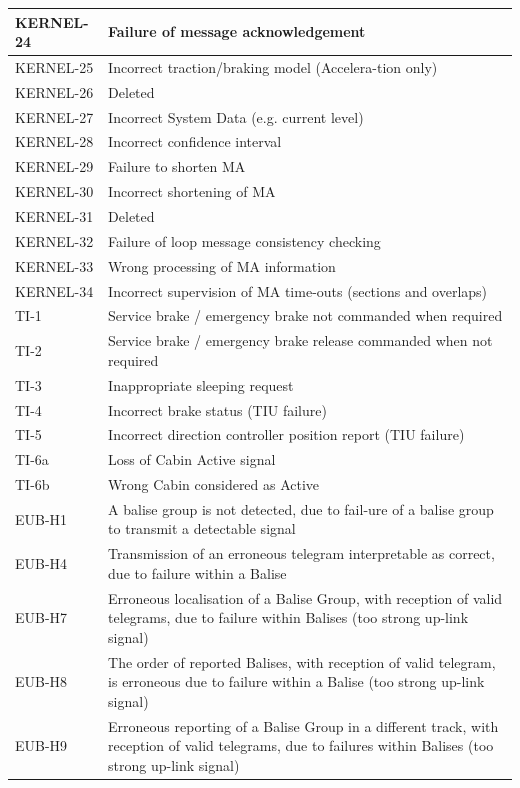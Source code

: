 \documentclass{template/openetcs_article}
\begin{document}
\begin{center}
\begin{longtable}{|m{3cm}|m{13cm}|}
KERNEL-24 & Failure of message acknowledgement \\\hline
KERNEL-25 & Incorrect traction/braking model (Accelera-tion only) \\\hline
KERNEL-26 & Deleted \\\hline
KERNEL-27 & Incorrect System Data (e.g. current level) \\\hline
KERNEL-28 & Incorrect confidence interval \\\hline
KERNEL-29 & Failure to shorten MA \\\hline
KERNEL-30 & Incorrect shortening of MA \\\hline
KERNEL-31 & Deleted \\\hline
KERNEL-32 & Failure of loop message consistency checking \\\hline
KERNEL-33 & Wrong processing of MA information \\\hline
KERNEL-34 & Incorrect supervision of MA time-outs (sections and overlaps) \\\hline
TI-1 & Service brake / emergency brake not commanded when required\\\hline
TI-2 & Service brake / emergency brake release commanded when not required\\\hline
TI-3 & Inappropriate sleeping request\\\hline
TI-4 & Incorrect brake status (TIU failure)\\\hline
TI-5 & Incorrect direction controller position report (TIU failure)\\\hline
TI-6a & Loss of Cabin Active signal\\\hline
TI-6b & Wrong Cabin considered as Active\\\hline
EUB-H1 & A balise group is not detected, due to fail-ure of a balise group to transmit a detectable signal\\\hline
EUB-H4 & Transmission of an erroneous telegram interpretable as correct, due to failure within a Balise\\\hline
EUB-H7 & Erroneous localisation of a Balise Group, with reception of valid telegrams, due to failure within Balises (too strong up-link signal)\\\hline
EUB-H8 & The order of reported Balises, with reception of valid telegram, is erroneous due to failure within a Balise (too strong up-link signal)\\\hline
EUB-H9 & Erroneous reporting of a Balise Group in a different track, with reception of valid telegrams, due to failures within Balises (too strong up-link signal)\\\hline

\end{longtable}
\end{center}
\end{document}
